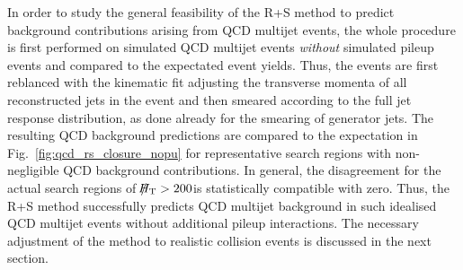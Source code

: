 In order to study the general feasibility of the R+S method to predict background contributions arising from QCD multijet events, the whole procedure is first performed on simulated QCD multijet events \textit{without} simulated pileup events and compared to the expectated event yields. Thus, the events are first reblanced with the kinematic fit adjusting the transverse momenta of all reconstructed jets in the event and then smeared according to the full jet response distribution, as done already for the smearing of generator jets. The resulting QCD background predictions are compared to the expectation in Fig.~\ref{fig:qcd_rs_closure_nopu} for representative search regions with non-negligible QCD background contributions. In general, the disagreement for the actual search regions of $\slash\mkern-12mu{H}_{\text{T}} > 200$\gev is statistically compatible with zero. Thus, the R+S method successfully predicts QCD multijet background in such idealised QCD multijet events without additional pileup interactions. The necessary adjustment of the method to realistic collision events is discussed in the next section.


